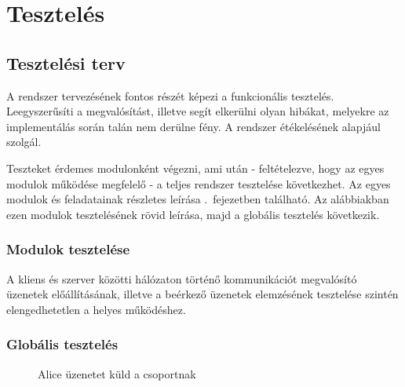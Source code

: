 
\section{Tesztelés}

\subsection{Tesztelési terv}
\label{sec:tesztelesi_terv}

A rendszer tervezésének fontos részét képezi a funkcionális tesztelés. Leegyszerűsíti a megvalósítást, illetve segít elkerülni olyan hibákat, melyekre az imp\-le\-men\-tá\-lás során talán nem derülne fény. A rendszer étékelésének alapjául szolgál.

Teszteket érdemes modulonként végezni, ami után - feltételezve, hogy az egyes mo\-du\-lok működése megfelelő - a teljes rendszer tesztelése következhet. %
Az egyes modulok és feladatainak részletes leírása .~fejezetben található. Az alábbiakban ezen modulok tesztelésének rövid leírása, majd a globális tesztelés következik.

\subsubsection{Modulok tesztelése}

A kliens és szerver közötti hálózaton történő kommunikációt megvalósító üzenetek előállításának, illetve a beérkező üzenetek elemzésének tesztelése szintén elengedhetetlen a helyes működéshez.

\subsubsection{Globális tesztelés}

\begin{figure}[htb]
\center
{}
\caption{Alice üzenetet küld a csoportnak}
\label{fig:teszt-vtf-kuldes-01}
\end{figure}

